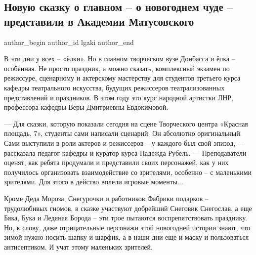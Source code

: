  
 
 
 
 
\subsection{Новую сказку о главном – о новогоднем чуде – представили в Академии Матусовского}
\label{sec:23_12_2021.stz.edu.lnr.lgaki.1.novaja_skazka_o_glavnom}

\ifcmt
 author_begin
   author_id lgaki
 author_end
\fi

В эти дни у всех – «ёлки». Но в главном творческом вузе Донбасса и ёлка –
особенная. Не просто праздник, а можно сказать, комплексный экзамен по
режиссуре, сценарному и актерскому мастерству для студентов третьего курса
кафедры театрального искусства, будущих режиссеров театрализованных
представлений и праздников. В этом году это курс народной артистки ЛНР,
профессора кафедры Веры Дмитриевны Евдокимовой.


— Для сказки, которую показали сегодня на сцене Творческого центра «Красная
площадь, 7», студенты сами написали сценарий. Он абсолютно оригинальный. Сами
выступили в роли актеров и режиссеров – у каждого был свой эпизод, — рассказала
педагог кафедры и куратор курса Надежда Рубель. — Преподаватели оценят, как
ребята продумали и представили своих персонажей, как у них получилось
организовать взаимодействие со зрителями, особенно – с маленькими зрителями.
Для этого в действо вплели игровые моменты...


Кроме Деда Мороза, Снегурочки и работников Фабрики подарков – трудолюбивых
гномов, в сказке участвуют добрейший Снеговик Снегослав, а еще Бяка, Бука и
Ледяная Борода – эти трое пытаются воспрепятствовать празднику. Но, к слову,
даже отрицательные персонажи этой новогодней истории знают, что зимой нужно
носить шапку и шарфик, а в наши дни еще и маску и пользоваться антисептиком. И
учат этому маленьких зрителей.

